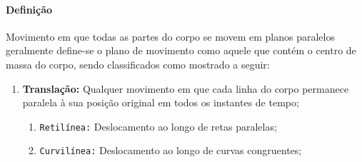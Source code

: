 \documentclass{article}
\begin{document}
            \paragraph{Definição}Movimento em que todas as partes do corpo se movem em planos paralelos geralmente define-se o plano de movimento como aquele que contém o centro de massa do corpo, sendo classificados como mostrado a seguir:
                \begin{enumerate}[rightmargin = \leftmargin]
                    \item \textbf{Translação:} Qualquer movimento em que cada linha do corpo permanece paralela à sua posição original em todos os instantes de tempo;
                        \begin{enumerate}[rightmargin = \leftmargin, noitemsep]
                            \item \texttt{Retilínea:} Deslocamento ao longo de retas paralelas;
                            \item \texttt{Curvilínea:} Deslocamento ao longo de curvas congruentes;
                        \end{enumerate}


\end{enumerate}
\end{document}
